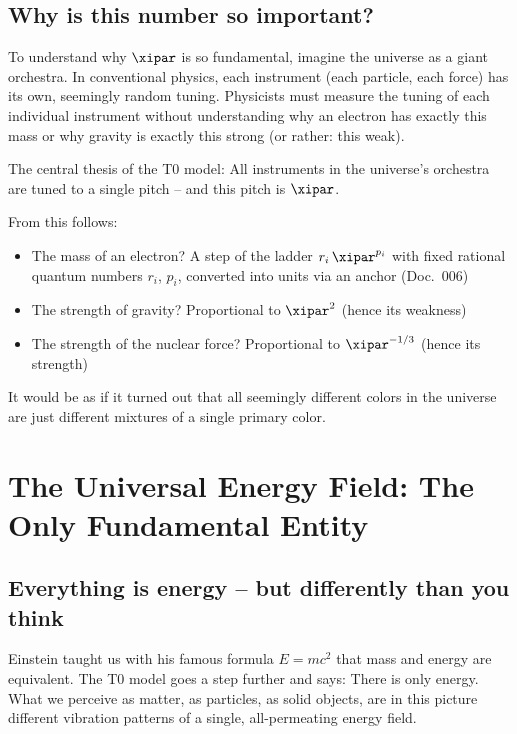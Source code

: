 	\subsection{Why is this number so important?}
	
	To understand why $\xipar$ is so fundamental, imagine the universe as a giant orchestra. In conventional physics, each instrument (each particle, each force) has its own, seemingly random tuning. Physicists must measure the tuning of each individual instrument without understanding why an electron has exactly this mass or why gravity is exactly this strong (or rather: this weak).
	
	\begin{important}
		The central thesis of the T0 model: All instruments in the universe's orchestra are tuned to a single pitch -- and this pitch is $\xipar$. 
		
		From this follows:
		\begin{itemize}
			\item The mass of an electron? A step of the ladder $r_i\,\xipar^{p_i}$ with fixed rational quantum numbers $r_i$, $p_i$, converted into units via an anchor (Doc.~006)
			\item The strength of gravity? Proportional to $\xipar^2$ (hence its weakness)
			\item The strength of the nuclear force? Proportional to $\xipar^{-1/3}$ (hence its strength)
		\end{itemize}
	\end{important}
	
	It would be as if it turned out that all seemingly different colors in the universe are just different mixtures of a single primary color.
	
	\section{The Universal Energy Field: The Only Fundamental Entity}
	
	\subsection{Everything is energy -- but differently than you think}
	
	Einstein taught us with his famous formula $E = mc^2$ that mass and energy are equivalent. The T0 model goes a step further and says: There is only energy. What we perceive as matter, as particles, as solid objects, are in this picture different vibration patterns of a single, all-permeating energy field.
	
